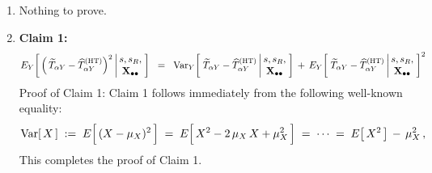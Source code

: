 \begin{enumerate}
\item
    Nothing to prove.
\item
    \textbf{Claim 1:}\quad
    \begin{equation*}
    E_{Y}\!\left[\,
        \left(\,\widetilde{T}_{\alpha Y} - \widehat{T}^{\textnormal{(HT)}}_{\alpha Y}\right)^{2}
        \left\vert\!\!
        \begin{array}{c} s,s_{R}, \\ \Xobs \end{array}
        \right.
        \!\!\right]
    \;\; = \;\;
        \Var_{Y}\!\left[\;
            \widetilde{T}_{\alpha Y} - \widehat{T}^{\textnormal{(HT)}}_{\alpha Y}
            \left\vert\!\!
            \begin{array}{c} s,s_{R}, \\ \Xobs \end{array}
            \right.
            \!\!\right]
        \,+\,
        E_{Y}\!\left[\;
            \widetilde{T}_{\alpha Y} - \widehat{T}^{\textnormal{(HT)}}_{\alpha Y}
            \left\vert\!\!
            \begin{array}{c} s,s_{R}, \\ \Xobs \end{array}
            \right.
            \!\!\right]^{2}
    \end{equation*}
    \vskip 0.1cm
    \noindent
    Proof of Claim 1:\;\;
    Claim 1 follows immediately from the following well-known equality:
    \begin{equation*}
    \Var[\,X\,]
    \; := \;
        E\!\left[\,\overset{{\color{white}.}}{(X - \mu_{X})^{2}}\,\right]
    \; = \;
        E\!\left[\,\overset{{\color{white}.}}{X^{2} - 2\,\mu_{X}\,X + \mu_{X}^{2}}\,\right]
    \; = \;
        \cdots
    \; = \;
        E\!\left[\,X^{2}\,\right] \,-\, \mu_{X}^{2}\,,
    \end{equation*}
    This completes the proof of Claim 1.


\end{enumerate}
